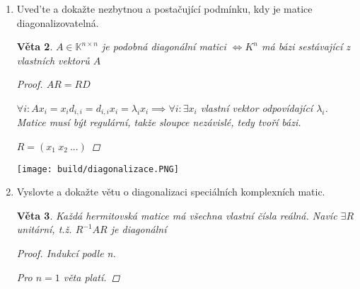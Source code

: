 \documentclass[10pt,a4paper]{article}
\theoremstyle{plain}
\newtheorem{veta}{Věta}
\begin{document}
\begin{enumerate}
\begin{veta}
\begin{proof}
Rozdělíme na tři rovnice podle exponentu $t$:

\begin{itemize}[label=pro]
\item $t^n: -B_{n-1} = (-1)^n I_n $ přenásobíme zleva $A^n$
\item $t^i: AB_i -B_{i-1} = a_i I_n $ přenásobíme zleva $A^i$
\item $t^0: AB_0 = a_0 I_n $
\end{itemize}

Rovnosti opět sečteme, dostaneme na levé straně: 
\[ -A^nB_{n-1} + A^{n-1}(AB_{n-1} -B_{n-2}) + A^{n-2}(AB_{n-2} -B_{n-3}) + ... + A(AB_1 - B_0) + AB_0 = 0_n \]

A na pravé straně:

\[  (-1)^nA^n  + a_{n-1} A^{n-1} + a_{n-2} A^{n-2} + ... + a_1A + a_0 I_n = p_A(A)\]

Tedy

\[p_A(A) = 0_n\]
\end{proof}
\end{veta}

\item Uved'te a dokažte nezbytnou a postačující podmínku, kdy je matice diagonalizovatelná.


\begin{veta}
$A \in \mathbb{K}^{n \times n}$ je podobná diagonální matici $\iff K^{n}$ má bázi sestávající z vlastních vektorů $A$
\begin{proof}
$AR = RD$

$\forall i: Ax_i = x_i d_{i,i} = d_{i,i}x_i = \lambda_i x_i \implies \forall i: \exists x_i $ vlastní vektor odpovídající $\lambda_i$. Matice musí být regulární, takže sloupce nezávislé, tedy tvoří bázi.

$R = (x_1\ x_2\ ...)$
\end{proof}
\end{veta}

\texttt{[image: build/diagonalizace.PNG]} 

\item Vyslovte a dokažte větu o diagonalizaci speciálních komplexních matic.


\begin{veta}
Každá hermitovská matice má všechna vlastní čísla reálná. Navíc $\exists R$ unitární, t.ž. $R^{-1}AR$ je diagonální
\begin{proof} Indukcí podle n.

Pro $n = 1$ věta platí.

\hfill


\end{proof}
\end{veta}
\end{enumerate}
\end{document}
